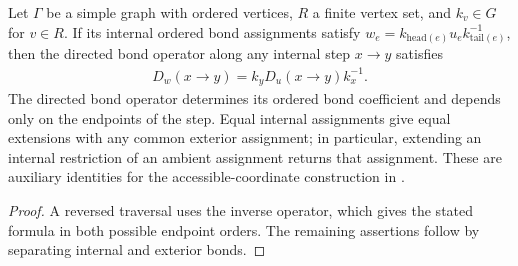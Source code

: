 \begin{lemma}
    \label{thm:peps_internal_gauge_transport}
    \leanok
    Let $\Gamma$ be a simple graph with ordered vertices, $R$ a finite vertex
    set, and $k_v\in G$ for $v\in R$. If its internal ordered bond assignments
    satisfy $w_e=k_{\mathrm{head}(e)}u_e k_{\mathrm{tail}(e)}^{-1}$, then
    the directed bond operator along any internal step $x\to y$ satisfies
    \begin{align}
        D_w(x\to y)=k_yD_u(x\to y)k_x^{-1}.
    \end{align}
    The directed bond operator determines its ordered bond coefficient and depends
    only on the endpoints of the step. Equal internal assignments give equal
    extensions with any common exterior assignment; in particular, extending
    an internal restriction of an ambient assignment returns that assignment.
    These are auxiliary identities for the accessible-coordinate construction
    in \cite[Section~6.3]{Schuch2010PEPS}.
\end{lemma}
\begin{proof}
    \leanok
    A reversed traversal uses the inverse operator, which gives the stated
    formula in both possible endpoint orders. The remaining assertions follow
    by separating internal and exterior bonds.
\end{proof}

